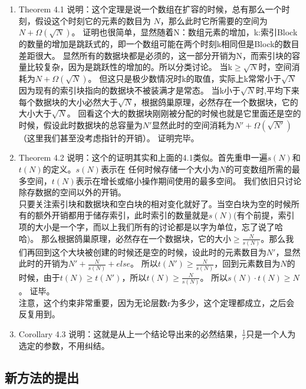 \documentclass[12pt,a4paper]{article}
\begin{document}
\begin{enumerate}
    \item Theorem 4.1 说明：这个定理是说一个数组在扩容的时候，总有那么一个时刻，假设这个时刻它的元素的数目为 $N$，那么此时它所需要的空间为 $N+\Omega(\sqrt{N})$。
    证明也很简单，显然随着N：数组元素的增加，k:索引Block的数量的增加是跳跃式的，即一个数组可能在两个时刻k相同但是Block的数目差距很大。
    显然所有的数据块都是必须的，这一部分开销为N，而索引块的容量比较复杂，因为是跳跃性的增加的。所以分类讨论。
    当k$\ge\sqrt{N}$时，空间消耗为$N+\Omega(\sqrt{N})$。
    但这只是极少数情况时k的取值，实际上k常常小于$\sqrt{N}$因为现有的索引块指向的数据块不被装满才是常态。
    当k小于$\sqrt{N}$时,平均下来每个数据块的大小必然大于$\sqrt{N}$，根据鸽巢原理，必然存在一个数据块，它的大小大于$\sqrt{N}$。
    回看这个大的数据块刚刚被分配的时候也就是它里面还是空的时候，假设此时数据块的总容量为$N'$显然此时的空间消耗为$N'+\Omega(\sqrt{N'})$（这里我们甚至没考虑指针的开销）。
    证明完毕。
    \item Theorem 4.2 说明：这个的证明其实和上面的4.1类似。首先重申一遍$s(N)$和$t(N)$的定义。$s(N)$表示在
    任何时候存储一个大小为$N$的可变数组所需的最多空间，$t(N)$表示在增长或缩小操作期间使用的最多空间。
    我们依旧只讨论除存数据的空间以外的开销。\\
    只要关注索引块和数据块和空白块的相对变化就好了。当空白块为空的时候所有的额外开销都用于储存索引，此时索引的数量就是$s(N)$(有个前提，索引项的大小是一个字，而以上我们所有的讨论都是以字为单位，忘了说了哈哈)。
    那么根据鸽巢原理，必然存在一个数据块，它的大小$\ge\frac{N}{s(N)}$。那么我们再回到这个大块被创建的时候还是空的时候，设此时的元素数目为$N'$，显然此时的开销为$N'+\frac{N}{s(N)}+else$。
    所以$t(N')\ge \frac{N}{s(N)}$，回到元素数目为$N$的时候，由于$t(N) \ge t(N')$，所以$t(N) \ge \frac{N}{s(N)}$。
    所以$s(N) \cdot t(N) \ge N$。
    证毕。\\
    注意，这个约束非常重要，因为无论层数r为多少，这个定理都成立，之后会反复用到。
    \item Corollary 4.3 说明：这就是从上一个结论导出来的必然结果，$\frac{1}{r}$只是一个人为选定的参数，不用纠结。\\
\end{enumerate}
\subsection{新方法的提出}
\end{document}
